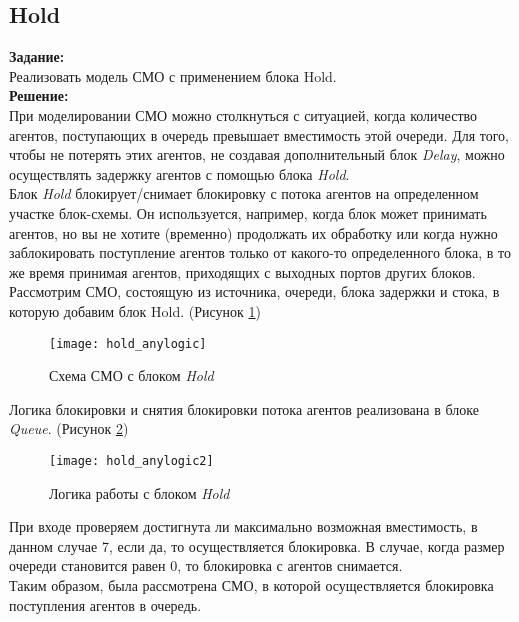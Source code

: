 \subsection*{Hold}

\textbf{Задание:}\\
Реализовать модель СМО с применением блока Hold.\\

\textbf{Решение:}\\
При моделировании СМО можно столкнуться с ситуацией, когда количество агентов, поступающих в очередь превышает вместимость этой очереди. Для того, чтобы не потерять этих агентов, не создавая дополнительный блок \textit{Delay}, можно осуществлять задержку агентов с помощью блока \textit{Hold}.\\

Блок \textit{Hold} блокирует/снимает блокировку с потока агентов на определенном участке блок-схемы. Он используется, например, когда блок может принимать агентов, но вы не хотите (временно) продолжать их обработку или когда нужно заблокировать поступление агентов только от какого-то определенного блока, в то же время принимая агентов, приходящих с выходных портов других блоков.\\

Рассмотрим СМО, состоящую из источника, очереди, блока задержки и стока, в которую добавим блок Hold. (Рисунок \ref{fig:hold_anylogic})
\begin{figure}[h]
	\centering \texttt{[image: hold\_anylogic]}
	\caption{Схема СМО с блоком \textit{Hold}}
	\label{fig:hold_anylogic}
\end{figure}

Логика блокировки и снятия блокировки потока агентов реализована в блоке \textit{Queue}. (Рисунок \ref{fig:hold_anylogic2})
\begin{figure}[h]
	\centering \texttt{[image: hold\_anylogic2]}
	\caption{Логика работы с блоком \textit{Hold}}
	\label{fig:hold_anylogic2}
\end{figure}

\newpage

При входе проверяем достигнута ли максимально возможная вместимость, в данном случае 7, если да, то осуществляется блокировка. В случае, когда размер очереди становится равен 0, то блокировка с агентов снимается.\\

Таким образом, была рассмотрена СМО, в которой осуществляется блокировка поступления агентов в очередь.